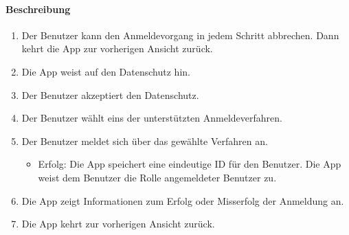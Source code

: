 \paragraph{Beschreibung}
\begin{enumerate}
      \item Der \Gls{Benutzer} kann den Anmeldevorgang in jedem Schritt abbrechen. Dann kehrt die App zur vorherigen Ansicht zurück.
      \item Die App weist auf den Datenschutz hin.
      \item Der \Gls{Benutzer} akzeptiert den Datenschutz.
      \item Der \Gls{Benutzer} wählt eins der unterstützten Anmeldeverfahren.
      \item Der \Gls{Benutzer} meldet sich über das gewählte Verfahren an.
            \begin{itemize}
                  \item{Erfolg:} Die App speichert eine eindeutige \Gls{ID} für den \Gls{Benutzer}. Die App weist dem \Gls{Benutzer} die Rolle \dq angemeldeter \Gls{Benutzer}\dq{} zu.
            \end{itemize}
      \item Die App zeigt Informationen zum Erfolg oder Misserfolg der Anmeldung an.
      \item Die App kehrt zur vorherigen Ansicht zurück. 
\end{enumerate}